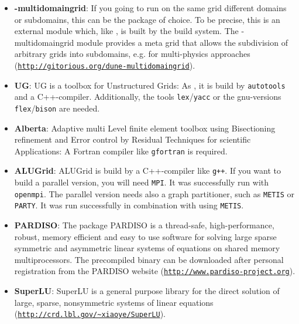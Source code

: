 \begin{itemize}
\item \textbf{\Dune-multidomaingrid}: If you going to run on the same grid different domains or subdomains,
this can be the package of choice. 
To be precise, this is an external \Dune module which, like \Dumux, is built by the \Dune build system. The \Dune-multidomaingrid module provides a meta grid that allows the subdivision of arbitrary \Dune grids into subdomains, e.g. for multi-physics approaches (\texttt{\url{http://gitorious.org/dune-multidomaingrid}}).

\item \textbf{UG}: UG is a toolbox for Unstructured Grids: As \Dumux, it is build by \texttt{autotools} and a C++-compiler. Additionally, the tools \texttt{lex}/\texttt{yacc} or the gnu-versions \texttt{flex}/\texttt{bison} are needed. 

\item \textbf{Alberta}: Adaptive multi Level finite element toolbox using Bisectioning refinement and Error control by Residual Techniques for scientific Applications: A Fortran compiler like \texttt{gfortran} is required.

\item \textbf{ALUGrid}: ALUGrid is build by a C++-compiler like \texttt{g++}. If you want to build a parallel version, you will need \texttt{MPI}. It was successfully run with \texttt{openmpi}. The parallel version needs also a graph partitioner, such as \texttt{METIS} or \texttt{PARTY}. It was run successfully in combination with \Dune using \texttt{METIS}.

\item \textbf{PARDISO}: The package PARDISO is a thread-safe, high-performance, robust, memory efficient and easy to use software for solving large sparse symmetric and asymmetric linear systems of equations on shared memory multiprocessors. The precompiled binary can be downloaded after personal registration from the PARDISO website (\texttt{\url{http://www.pardiso-project.org}}).

\item \textbf{SuperLU}: SuperLU is a general purpose library for the direct solution of large, sparse, nonsymmetric systems of linear equations (\texttt{\url{http://crd.lbl.gov/~xiaoye/SuperLU}}).

\end{itemize}

